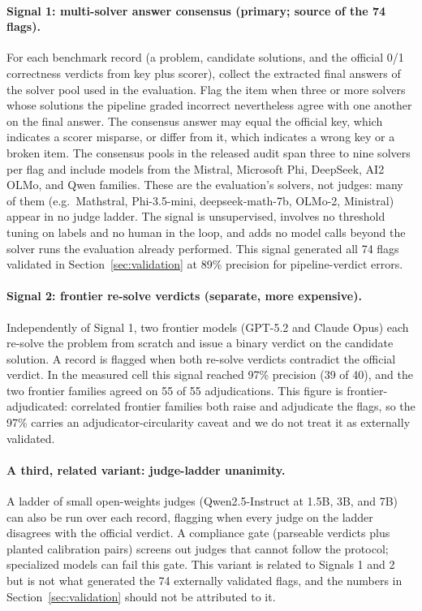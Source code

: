 \documentclass[11pt]{article}
\begin{document}
\paragraph{Signal 1: multi-solver answer consensus (primary; source of the 74 flags).}
For each benchmark record (a problem, candidate solutions, and the official 0/1 correctness verdicts from key plus scorer), collect the extracted final answers of the solver pool used in the evaluation.
Flag the item when three or more solvers whose solutions the pipeline graded incorrect nevertheless agree with one another on the final answer.
The consensus answer may equal the official key, which indicates a scorer misparse, or differ from it, which indicates a wrong key or a broken item.
The consensus pools in the released audit span three to nine solvers per flag and include models from the Mistral, Microsoft Phi, DeepSeek, AI2 OLMo, and Qwen families.
These are the evaluation's solvers, not judges: many of them (e.g.\ Mathstral, Phi-3.5-mini, deepseek-math-7b, OLMo-2, Ministral) appear in no judge ladder.
The signal is unsupervised, involves no threshold tuning on labels and no human in the loop, and adds no model calls beyond the solver runs the evaluation already performed.
This signal generated all 74 flags validated in Section~\ref{sec:validation} at 89\% precision for pipeline-verdict errors.

\paragraph{Signal 2: frontier re-solve verdicts (separate, more expensive).}
Independently of Signal 1, two frontier models (GPT-5.2 and Claude Opus) each re-solve the problem from scratch and issue a binary verdict on the candidate solution.
A record is flagged when both re-solve verdicts contradict the official verdict.
In the measured cell this signal reached 97\% precision (39 of 40), and the two frontier families agreed on 55 of 55 adjudications.
This figure is frontier-adjudicated: correlated frontier families both raise and adjudicate the flags, so the 97\% carries an adjudicator-circularity caveat and we do not treat it as externally validated.

\paragraph{A third, related variant: judge-ladder unanimity.}
A ladder of small open-weights judges (Qwen2.5-Instruct at 1.5B, 3B, and 7B) can also be run over each record, flagging when every judge on the ladder disagrees with the official verdict.
A compliance gate (parseable verdicts plus planted calibration pairs) screens out judges that cannot follow the protocol; specialized models can fail this gate.
This variant is related to Signals 1 and 2 but is not what generated the 74 externally validated flags, and the numbers in Section~\ref{sec:validation} should not be attributed to it.
\end{document}
